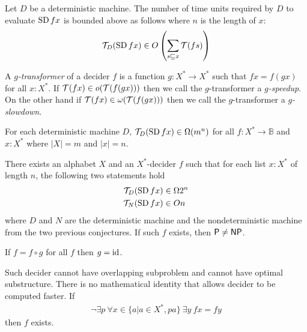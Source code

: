\begin{msco}
    Let $D$ be a deterministic machine.
    The number of time units required by $D$
    to evaluate $\operatorname{SD} fx$ is bounded above as follows
    where $n$ is the length of $x$:
    \begin{align}
        \mathcal{T}_D(\operatorname{SD} fx) \in O \left( \sum_{s \sqsubseteq x} \mathcal{T}(fs) \right)
    \end{align}
\end{msco}

\begin{mdef}[$g$-transformer]
    A \emph{$g$-transformer} of a decider $f$ is a function $g : X^* \to X^*$
    such that $fx = f(gx)$ for all $x : X^*$.
    If $\mathcal{T}(fx) \in o(\mathcal{T}(f(gx)))$ then
    we call the $g$-transformer a \emph{$g$-speedup}.
    On the other hand if $\mathcal{T}(fx) \in \omega(\mathcal{T}(f(gx)))$ then
    we call the $g$-transformer a \emph{$g$-slowdown}.
\end{mdef}

\begin{mcon}
    For each deterministic machine $D$,
    $\mathcal{T}_D(\operatorname{SD} fx) \in \Omega(m^n)$ for all $f : X^* \to \mathbb B$
    and $x : X^*$
    where $|X| = m$
    and $|x| = n$.
\end{mcon}

\begin{mcon}
There exists an alphabet $X$
and an $X^*$-decider $f$ such that
for each list $x : X^*$ of length $n$,
the following two statements hold
\begin{align}
    \mathcal{T}_D(\operatorname{SD} fx) &\in \Omega 2^n
    \\
    \mathcal{T}_N(\operatorname{SD} fx) &\in O n
\end{align}
where $D$ and $N$ are the deterministic machine
and the nondeterministic machine from the two previous conjectures.
If such $f$ exists, then $\mathsf{P} \neq \mathsf{NP}$.
\end{mcon}

\begin{mcon}
    If $f = f \circ g$ for all $f$ then $g = \operatorname{id}$.
\end{mcon}

\begin{mcon}
Such decider cannot have overlapping subproblem
and cannot have optimal substructure.
There is no mathematical identity that allows decider to be computed faster.
If
\begin{align}
    \neg\exists p ~ \forall x \in \{ a | a \in X^*, p a \} ~ \exists y ~ fx = fy
\end{align}
then $f$ exists.
\end{mcon}

